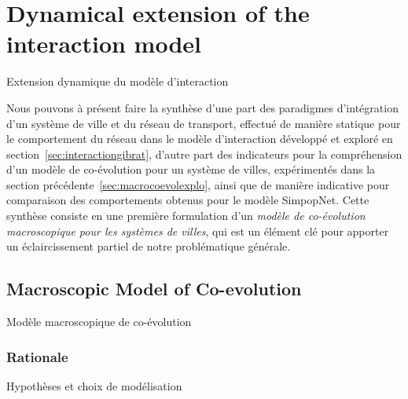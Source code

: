 




\newpage

\section{Dynamical extension of the interaction model}{Extension dynamique du modèle d'interaction}



\label{sec:macrocoevol}





Nous pouvons à présent faire la synthèse d'une part des paradigmes d'intégration d'un système de ville et du réseau de transport, effectué de manière statique pour le comportement du réseau dans le modèle d'interaction développé et exploré en section~\ref{sec:interactiongibrat}, d'autre part des indicateurs pour la compréhension d'un modèle de co-évolution pour un système de villes, expérimentés dans la section précédente~\ref{sec:macrocoevolexplo}, ainsi que de manière indicative pour comparaison des comportements obtenus pour le modèle SimpopNet. Cette synthèse consiste en une première formulation d'un \emph{modèle de co-évolution macroscopique pour les systèmes de villes}, qui est un élément clé pour apporter un éclaircissement partiel de notre problématique générale.



\subsection{Macroscopic Model of Co-evolution}{Modèle macroscopique de co-évolution}


\subsubsection{Rationale}{Hypothèses et choix de modélisation}




